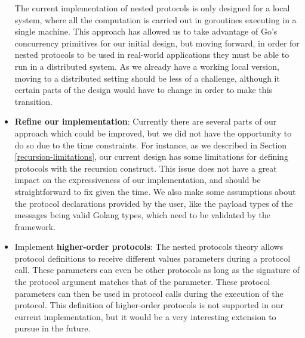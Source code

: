 \documentclass[12pt,twoside]{report}
\begin{document}
\begin{itemize}
    The current implementation of nested protocols is only designed for a local system, where all the computation is carried out in goroutines executing in a single machine. This approach has allowed us to take advantage of Go's concurrency primitives for our initial design, but moving forward, in order for nested protocols to be used in real-world applications they must be able to run in a distributed system. As we already have a working local version, moving to a distributed setting should be less of a challenge, although it certain parts of the design would have to change in order to make this transition.
    \item \textbf{Refine our implementation}: Currently there are several parts of our approach which could be improved, but we did not have the opportunity to do so due to the time constraints. For instance, as we described in Section \ref{recursion-limitations}, our current design has some limitations for defining protocols with the recursion construct. This issue does not have a great impact on the expressiveness of our implementation, and should be straightforward to fix given the time. We also make some assumptions about the protocol declarations provided by the user, like the payload types of the messages being valid Golang types, which need to be validated by the framework.
    \item Implement \textbf{higher-order protocols}: The nested protocols theory allows protocol definitions to receive different values parameters during a protocol call. These parameters can even be other protocols as long as the signature of the protocol argument matches that of the parameter. These protocol parameters can then be used in protocol calls during the execution of the protocol. This definition of higher-order protocols is not supported in our current implementation, but it would be a very interesting extension to pursue in the future.
\end{itemize}



    
\end{document}
